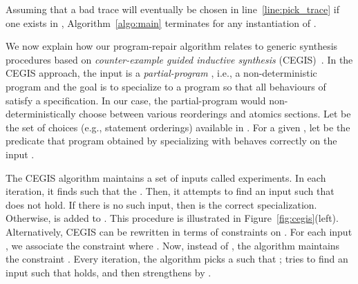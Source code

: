 \documentclass{llncs}
\newcommand\new{\color{red}}
\newcommand\remove[1]{}
\newcommand\mypara[1]{\noindent{\bf #1}}
\begin{document}
\begin{theorem}
  Assuming that a bad trace will eventually be chosen in 
  line~\ref{line:pick_trace} if one exists in , Algorithm~\ref{algo:main}
  terminates for any instantiation of .
\end{theorem}
\remove{
\begin{proof}[outline]
 {\new Fairness guarantees that eventually a bad trace will be chosen if there exists one.
 Every call to  either increases an atomic section or adds a constraint. The number of both is finite. The correct program always exists because every thread can be wrapped into an atomic section and all sequential traces are good.
}\end{proof}
}










\newcommand\choices{\mathcal{C}}
\newcommand\choice{\mathbf{c}}
\newcommand\expts{\mathcal{E}}
\newcommand\inp{\mathbf{i}}
\mypara{A Generic Program-Repair Algorithm.}
We now explain how our program-repair algorithm relates to generic
synthesis procedures based on {\em counter-example guided inductive
synthesis} (CEGIS)~\cite{asplos06}.
In the CEGIS approach, the input is a {\em partial-program} , i.e., a
non-deterministic program and the goal is to specialize  to a
program  so that all behaviours of  satisfy a
specification.
In our case, the partial-program would non-deterministically choose
between various reorderings and atomics sections.
Let  be the set of choices (e.g., statement
orderings) available in .
For a given , let  be the predicate that program obtained by
specializing  with  behaves correctly on the input
.

The CEGIS algorithm maintains a set  of inputs 
called experiments.
In each iteration, it finds  such
that the .
Then, it attempts to find an input  such that
 does not hold.
If there is no such input, then  is the correct
specialization.
Otherwise,  is added to .
This procedure is illustrated in Figure~\ref{fig:cegis}(left).
Alternatively, CEGIS can be rewritten in terms of
constraints on .
For each input , we associate the constraint 
where .
Now, instead of , the algorithm maintains the constraint .
Every iteration, the algorithm picks a  such that ; tries to find an input  such that
 holds, and then strengthens
 by .
\end{document}
